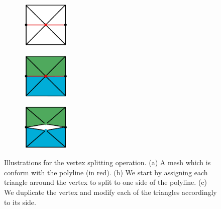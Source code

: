 \begin{figure}[p]
\centering
\begin{subfigure}[c]{0.3\linewidth}
\centering
\includegraphics[height=2.2cm]{images/cutting-mig2015/vertex_splitting_1.pdf}
\caption{\label{fig:vertexSplitting1}}
\end{subfigure}
\begin{subfigure}[c]{0.3\linewidth}
\centering
\includegraphics[height=2.2cm]{images/cutting-mig2015/vertex_splitting_2.pdf}
\caption{\label{fig:vertexSplitting2}}
\end{subfigure}
\begin{subfigure}[c]{0.3\linewidth}
\centering
\includegraphics[height=2.2cm]{images/cutting-mig2015/vertex_splitting_3.pdf}
\caption{\label{fig:vertexSplitting3}}
\end{subfigure}
\caption[Frame-based cutting: Vertex splitting]{\label{fig:vertexSplitting} Illustrations for the vertex splitting operation. (a) A mesh which is conform with the polyline (in red). (b) We start by assigning each triangle arround the vertex to split to one side of the polyline. (c) We duplicate the vertex and modify each of the triangles accordingly to its side.}
\end{figure}
